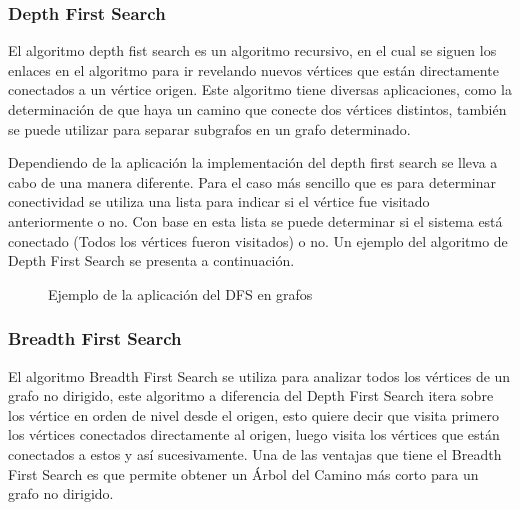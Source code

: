 \documentclass[a4paper, 11pt]{report}
\newcommand{\DrawGraph}[5]{

    \begin{scope}[#4]
    \foreach \pos/\nodo in {{(0,0)/1}, {(2,1)/2}, {(4,1)/3}, {(0,2)/4}, {(3,0)/5}, {(2,-1)/6}, {(4,-1)/7}}
        \node[vertex] (#3\nodo) at \pos {\nodo};

    \foreach \start/\end in {1/4, 1/2, 1/6,2/5,2/3,2/6,5/7,3/7,4/2,6/7}
        \path[edge,#5] (#3\start) -- (#3\end);

    \foreach \nodo in {#1}
        \node[selected vertex] at (#3\nodo) {\nodo};
        

    \begin{pgfonlayer}{background}
        \foreach \start/\end in {#2}
            \path[selected edge,#5] (#3\start) -- (#3\end);
    \end{pgfonlayer}
    \end{scope}
}
\newcommand{\DrawArrow}[1]{
    \begin{scope}[scale=0.5,#1]
        \filldraw[arrow] (0,0) -- (2,0) -- +(270:0.5) -- (3,0.5) -- (2,1.5) -- +(270:0.5) -- (0,1) -- cycle;
    \end{scope}
}
\newcommand{\Deactivate}{\shorthandoff{<>."}}
\newcommand{\Activate}{\shorthandon{<>."}}
\begin{document}
\subsubsection{Depth First Search}
El algoritmo depth fist search es un algoritmo recursivo, en el cual se siguen los enlaces en el algoritmo para ir revelando nuevos v\'ertices que est\'an directamente conectados a un v\'ertice origen. Este algoritmo tiene diversas aplicaciones, como la determinaci\'on de que haya un camino que conecte dos v\'ertices distintos, tambi\'en se puede utilizar para separar subgrafos en un grafo determinado. 

Dependiendo de la aplicaci\'on la implementaci\'on del depth first search se lleva a cabo de una manera diferente. Para el caso m\'as sencillo que es para determinar conectividad se utiliza una lista para indicar si el v\'ertice fue visitado anteriormente o no. Con base en esta lista se puede determinar si el sistema est\'a conectado (Todos los v\'ertices fueron visitados) o no. Un ejemplo del algoritmo de Depth First Search se presenta a continuaci\'on.

\begin{figure}[!h]
    \centering
    \caption{Ejemplo de la aplicaci\'on del DFS en grafos}
    \label{DFSFigure}
\end{figure}

\subsubsection{Breadth First Search}
El algoritmo Breadth First Search se utiliza para analizar todos los v\'ertices de un grafo no dirigido, este algoritmo a diferencia del Depth First Search itera sobre los v\'ertice en orden de nivel desde el origen, esto quiere decir que visita primero los v\'ertices conectados directamente al origen, luego visita los v\'ertices que est\'an conectados a estos y as\'i sucesivamente. Una de las ventajas que tiene el Breadth First Search es que permite obtener un \'Arbol del Camino m\'as corto para un grafo no dirigido. 
\end{document}
